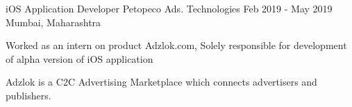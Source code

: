 \begin{cventries}
{    }
  \vspace{1.0em}
  \cventry
    {iOS Application Developer} %
    {Petopeco Ads. Technologies} %
    {Feb 2019 - May 2019} %
    {Mumbai, Maharashtra} %
    {
      \begin{cvitems} %
        \item Worked as an intern on product Adzlok.com, Solely responsible for development of alpha version of iOS application
        \item Adzlok is a C2C Advertising Marketplace which connects advertisers and publishers.
      \end{cvitems}
    }
\end{cventries}
